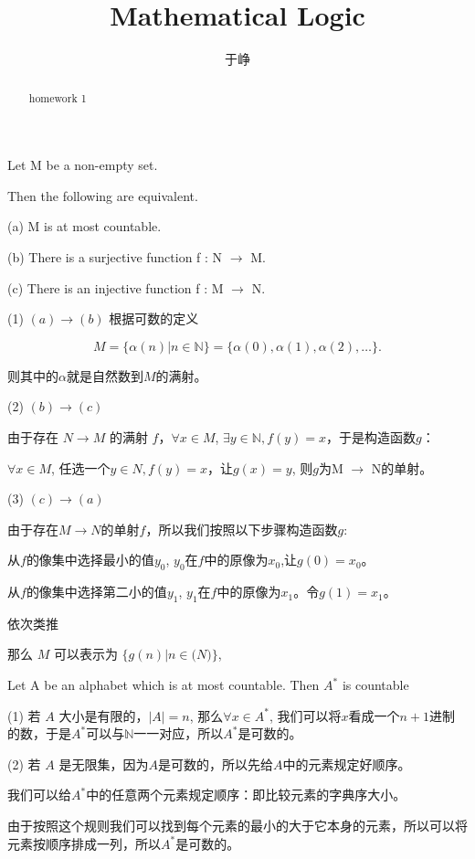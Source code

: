 \documentclass{ximera}
\title{Mathematical Logic}
\author{于峥}
\begin{document}
\begin{abstract}
    homework 1
\end{abstract}
\maketitle

\begin{problem} Let M be a non-empty set. 
    
    Then the following are equivalent.

    (a) M is at most countable.

    (b) There is a surjective function f : N $\rightarrow$ M.

    (c) There is an injective function f : M $\rightarrow$ N.
    \begin{solution}
        (1) $(a) \rightarrow (b)$
        根据可数的定义

        $$
        M = \{ \alpha(n) | n \in \mathbb{N} \} = \{ \alpha(0), \alpha(1), \alpha(2), \dots \}.
        $$

        则其中的$\alpha$就是自然数到$M$的满射。

        (2) $(b) \rightarrow (c) $

        由于存在 $N \rightarrow M$ 的满射 $f$，$\forall x \in M$, $\exists y \in \mathbb{N}, f(y) = x$，于是构造函数$g$：

        $\forall x \in M$, 任选一个$y \in N, f(y) = x$，让$g(x) = y$, 则$g$为M $\rightarrow$ N的单射。

        (3) $(c) \rightarrow (a)$

        由于存在$M \rightarrow N$的单射$f$，所以我们按照以下步骤构造函数$g$:

        从$f$的像集中选择最小的值$y_0$, $y_0$在$f$中的原像为$x_0$,让$g(0) = x_0$。


        从$f$的像集中选择第二小的值$y_1$, $y_1$在$f$中的原像为$x_1$。令$g(1) = x_1$。

        依次类推

        那么 $M$ 可以表示为 $\{ g(n) | n \in \mathbb(N) \}$, 



    \end{solution}    
\end{problem} 

\begin{problem} Let A be an alphabet which is at most countable. Then $A^*$ is countable
    \begin{solution}
        (1) 若 $A$ 大小是有限的，$|A| = n$, 那么$\forall x \in A^*$, 我们可以将$x$看成一个$n+1$进制的数，于是$A^*$可以与$\mathbb{N}$一一对应，所以$A^*$是可数的。

        (2) 若 $A$ 是无限集，因为$A$是可数的，所以先给$A$中的元素规定好顺序。

        我们可以给$A^*$中的任意两个元素规定顺序：即比较元素的字典序大小。

        由于按照这个规则我们可以找到每个元素的最小的大于它本身的元素，所以可以将元素按顺序排成一列，所以$A^*$是可数的。



    \end{solution}
\end{problem}
 
\end{document}
